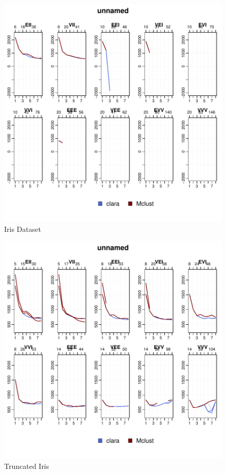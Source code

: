 \begin{figure}[h!]
    \centering
\includegraphics{chapter3-figiris}
    \caption{Iris Dataset}
    \label{fig:iris}
\end{figure}

\begin{figure}[h!]
    \centering
\includegraphics{chapter3-figtriris}
    \caption{Truncated Iris}
    \label{fig:triris}
\end{figure}

